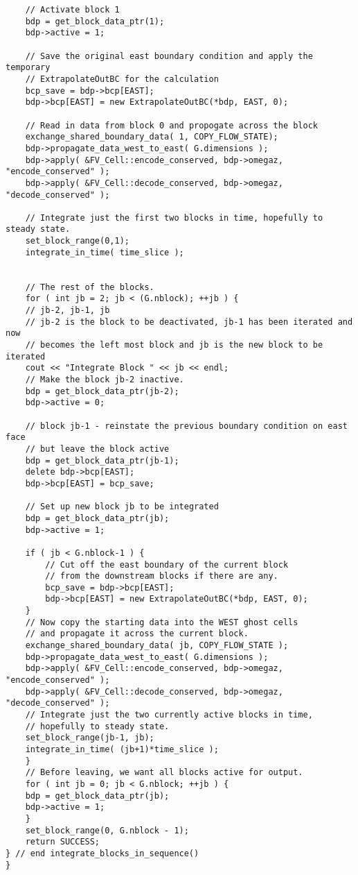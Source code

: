 {\begin{verbatim}
    // Activate block 1
    bdp = get_block_data_ptr(1);
    bdp->active = 1;

    // Save the original east boundary condition and apply the temporary
    // ExtrapolateOutBC for the calculation
    bcp_save = bdp->bcp[EAST];
    bdp->bcp[EAST] = new ExtrapolateOutBC(*bdp, EAST, 0);

    // Read in data from block 0 and propogate across the block
    exchange_shared_boundary_data( 1, COPY_FLOW_STATE);
    bdp->propagate_data_west_to_east( G.dimensions );
    bdp->apply( &FV_Cell::encode_conserved, bdp->omegaz, "encode_conserved" );
    bdp->apply( &FV_Cell::decode_conserved, bdp->omegaz, "decode_conserved" );

    // Integrate just the first two blocks in time, hopefully to steady state.
    set_block_range(0,1);
    integrate_in_time( time_slice );


    // The rest of the blocks.
    for ( int jb = 2; jb < (G.nblock); ++jb ) {
	// jb-2, jb-1, jb
	// jb-2 is the block to be deactivated, jb-1 has been iterated and now
	// becomes the left most block and jb is the new block to be iterated
	cout << "Integrate Block " << jb << endl;
	// Make the block jb-2 inactive.
	bdp = get_block_data_ptr(jb-2);
	bdp->active = 0;

	// block jb-1 - reinstate the previous boundary condition on east face
	// but leave the block active
	bdp = get_block_data_ptr(jb-1);
	delete bdp->bcp[EAST];
	bdp->bcp[EAST] = bcp_save;

	// Set up new block jb to be integrated
	bdp = get_block_data_ptr(jb);
	bdp->active = 1;

	if ( jb < G.nblock-1 ) {
	    // Cut off the east boundary of the current block 
	    // from the downstream blocks if there are any.
	    bcp_save = bdp->bcp[EAST];
	    bdp->bcp[EAST] = new ExtrapolateOutBC(*bdp, EAST, 0);
	}
	// Now copy the starting data into the WEST ghost cells
	// and propagate it across the current block.
	exchange_shared_boundary_data( jb, COPY_FLOW_STATE );
	bdp->propagate_data_west_to_east( G.dimensions );
	bdp->apply( &FV_Cell::encode_conserved, bdp->omegaz, "encode_conserved" );
	bdp->apply( &FV_Cell::decode_conserved, bdp->omegaz, "decode_conserved" );
	// Integrate just the two currently active blocks in time,
	// hopefully to steady state.
	set_block_range(jb-1, jb);
	integrate_in_time( (jb+1)*time_slice );
    }
    // Before leaving, we want all blocks active for output.
    for ( int jb = 0; jb < G.nblock; ++jb ) {
	bdp = get_block_data_ptr(jb);
	bdp->active = 1;
    }
    set_block_range(0, G.nblock - 1);
    return SUCCESS;
} // end integrate_blocks_in_sequence()
}
\end{verbatim}
}